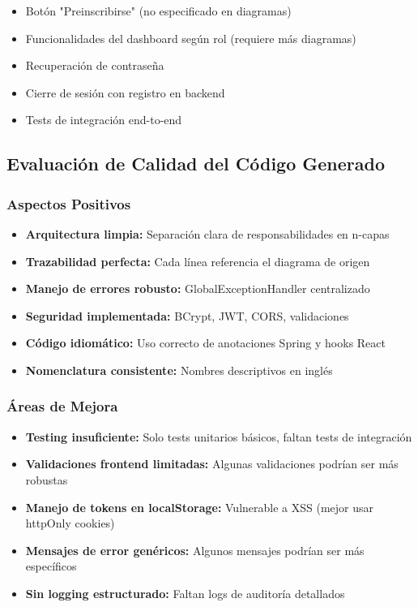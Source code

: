 \documentclass[11pt,a4paper]{article}
\begin{document}
\begin{itemize}
    \item Botón "Preinscribirse" (no especificado en diagramas)
    \item Funcionalidades del dashboard según rol (requiere más diagramas)
    \item Recuperación de contraseña
    \item Cierre de sesión con registro en backend
    \item Tests de integración end-to-end
\end{itemize}

\subsection{Evaluación de Calidad del Código Generado}

\subsubsection{Aspectos Positivos}

\begin{itemize}
    \item \textbf{Arquitectura limpia:} Separación clara de responsabilidades en n-capas
    \item \textbf{Trazabilidad perfecta:} Cada línea referencia el diagrama de origen
    \item \textbf{Manejo de errores robusto:} GlobalExceptionHandler centralizado
    \item \textbf{Seguridad implementada:} BCrypt, JWT, CORS, validaciones
    \item \textbf{Código idiomático:} Uso correcto de anotaciones Spring y hooks React
    \item \textbf{Nomenclatura consistente:} Nombres descriptivos en inglés
\end{itemize}

\subsubsection{Áreas de Mejora}

\begin{itemize}
    \item \textbf{Testing insuficiente:} Solo tests unitarios básicos, faltan tests de integración
    \item \textbf{Validaciones frontend limitadas:} Algunas validaciones podrían ser más robustas
    \item \textbf{Manejo de tokens en localStorage:} Vulnerable a XSS (mejor usar httpOnly cookies)
    \item \textbf{Mensajes de error genéricos:} Algunos mensajes podrían ser más específicos
    \item \textbf{Sin logging estructurado:} Faltan logs de auditoría detallados
\end{itemize}
\end{document}
